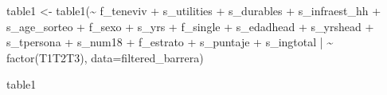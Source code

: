 \documentclass[
]{article}
\newenvironment{Shaded}{\begin{snugshade}}{\end{snugshade}}
\newcommand{\AttributeTok}[1]{\textcolor[rgb]{0.77,0.63,0.00}{#1}}
\newcommand{\ErrorTok}[1]{\textcolor[rgb]{0.64,0.00,0.00}{\textbf{#1}}}
\newcommand{\FunctionTok}[1]{\textcolor[rgb]{0.00,0.00,0.00}{#1}}
\newcommand{\NormalTok}[1]{#1}
\newcommand{\OtherTok}[1]{\textcolor[rgb]{0.56,0.35,0.01}{#1}}
\newcommand{\SpecialCharTok}[1]{\textcolor[rgb]{0.00,0.00,0.00}{#1}}
\begin{document}
\begin{Shaded}
\begin{Highlighting}[]
\NormalTok{table1 }\OtherTok{\textless{}{-}} \FunctionTok{table1}\NormalTok{(}\SpecialCharTok{\textasciitilde{}}\NormalTok{ f\_teneviv }\SpecialCharTok{+}\NormalTok{ s\_utilities }\SpecialCharTok{+}\NormalTok{ s\_durables }\SpecialCharTok{+}\NormalTok{ s\_infraest\_hh }\SpecialCharTok{+}\NormalTok{ s\_age\_sorteo }\SpecialCharTok{+}\NormalTok{ f\_sexo }\SpecialCharTok{+}\NormalTok{ s\_yrs }\SpecialCharTok{+}\NormalTok{ f\_single }\SpecialCharTok{+}\NormalTok{ s\_edadhead }\SpecialCharTok{+}\NormalTok{ s\_yrshead }\SpecialCharTok{+}\NormalTok{ s\_tpersona }\SpecialCharTok{+}\NormalTok{ s\_num18 }\SpecialCharTok{+}\NormalTok{ f\_estrato }\SpecialCharTok{+}\NormalTok{ s\_puntaje }\SpecialCharTok{+}\NormalTok{ s\_ingtotal }\SpecialCharTok{|} \ErrorTok{\textasciitilde{}} \FunctionTok{factor}\NormalTok{(T1T2T3), }\AttributeTok{data=}\NormalTok{filtered\_barrera)}

\NormalTok{table1}
\end{Highlighting}
\end{Shaded}
\end{document}
